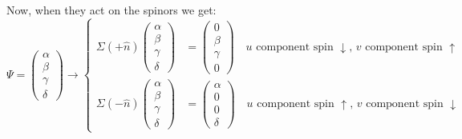 \documentclass[../main.tex]{subfiles}
\begin{document}
Now, when they act on the spinors we get:
\[
\Psi=\left(\begin{array}{c}
     \alpha \\
     \beta \\
     \gamma \\
     \delta
\end{array}\right)
\xrightarrow[]{}
\left\{
\begin{aligned}
\Sigma(+\hat{n})\left(\begin{array}{c}
     \alpha \\
     \beta \\
     \gamma \\
     \delta
\end{array}\right)&=\left(\begin{array}{c}
     0 \\
     \beta \\
     \gamma \\
     0
\end{array}\right) \quad \text{$u$ component spin $\downarrow$, $v$ component spin $\uparrow$}\\
\Sigma(-\hat{n})\left(\begin{array}{c}
     \alpha \\
     \beta \\
     \gamma \\
     \delta
\end{array}\right)&=\left(\begin{array}{c}
     \alpha \\
     0 \\
     0 \\
     \delta
\end{array}\right) \quad \text{$u$ component spin $\uparrow$, $v$ component spin $\downarrow$}
\end{aligned}
\right.
\]
\end{document}

